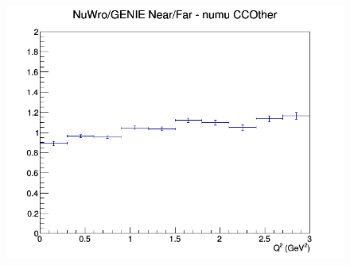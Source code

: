 \begin{figure}[h]
\endminipage
{}
\includegraphics[width=\linewidth]{Q2/nominal/ratios/CCOther_NuWro_GENIE_numu_NF_Q2.png}
\endminipage
\newline
\end{figure}
\clearpage
